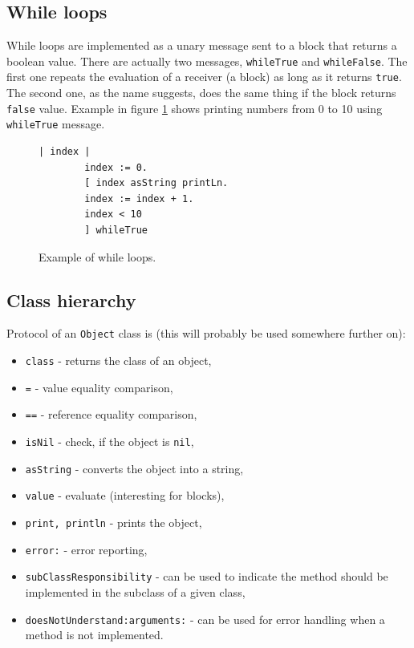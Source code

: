 \documentclass[thesis=M,english]{FITthesis}[2019/12/23]
\begin{document}
\subsection{While loops}
While loops are implemented as a unary message sent to a block that returns a boolean value. There are actually
two messages, \texttt{whileTrue} and \texttt{whileFalse}. The first one repeats the evaluation of a receiver (a block)
as long as it returns \texttt{true}. The second one, as the name suggests, does the same thing if the block returns
\texttt{false} value. Example in figure \ref{lst-while} shows printing numbers from 0 to 10 using \texttt{whileTrue}
message.

\begin{figure}[h!]
	\begin{lstlisting}[language=Smalltalk]
		| index |
		index := 0.
		[ index asString printLn.
		index := index + 1.
		index < 10
		] whileTrue
	\end{lstlisting}
	\caption{Example of while loops.}
	\label{lst-while}
\end{figure}

\subsection{Class hierarchy}
Protocol of an \texttt{Object} class is (this will probably be used somewhere further on):
\begin{itemize}
	\item \texttt{class} - returns the class of an object,
	\item \texttt{=} - value equality comparison,
	\item \texttt{==} - reference equality comparison,
	\item \texttt{isNil} - check, if the object is \texttt{nil},
	\item \texttt{asString} - converts the object into a string,
	\item \texttt{value} - evaluate (interesting for blocks),
	\item \texttt{print, println} - prints the object,
	\item \texttt{error:} - error reporting,
	\item \texttt{subClassResponsibility} - can be used to indicate the method should be
		implemented in the subclass of a given class,
	\item \texttt{doesNotUnderstand:arguments:} - can be used for error handling when a method is not implemented.
\end{itemize}
\end{document}
